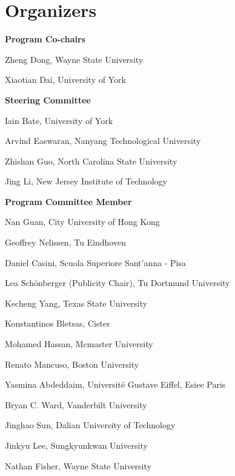 \documentclass{article}
\begin{document}


\section*{Organizers}

\noindent \quad

\noindent \textbf{Program Co-chairs}
\vspace{0.5em}

Zheng Dong, Wayne State University

Xiaotian Dai, University of York

\vspace{1em}

\noindent \textbf{Steering Committee}
\vspace{0.5em}

Iain Bate, University of York

Arvind Easwaran, Nanyang Technological University

Zhishan Guo, North Carolina State University

Jing Li, New Jersey Institute of Technology

\vspace{1em}

\noindent \textbf{Program Committee Member}
\vspace{0.5em}

Nan Guan, City University of Hong Kong

Geoffrey Nelissen, Tu Eindhoven

Daniel Casini, Scuola Superiore Sant'anna - Pisa

Lea Schönberger (Publicity Chair), Tu Dortmund University

Kecheng Yang, Texas State University

Konstantinos Bletsas, Cister

Mohamed Hassan, Mcmaster University

Renato Mancuso, Boston University

Yasmina Abdeddaim, Université Gustave Eiffel, Esiee Paris

Bryan C. Ward, Vanderbilt University

Jinghao Sun, Dalian University of Technology

Jinkyu Lee, Sungkyunkwan University

Nathan Fisher, Wayne State University
\end{document}
